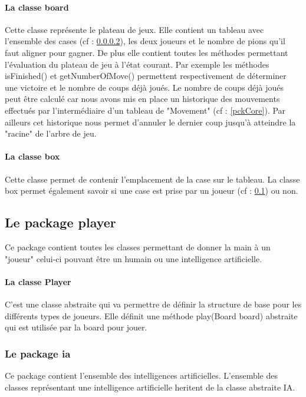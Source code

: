 \documentclass{report}
\begin{document}
                		\paragraph{La classe board}\label{classeBoard}
               			 Cette classe représente le plateau de jeux. Elle contient un tableau avec l'ensemble des cases (cf : \ref{classBox}), les deux joueurs et le nombre de pions qu'il faut aligner pour gagner.
               			 De plus elle contient toutes les méthodes permettant l'évaluation du plateau de jeu à l'état courant. Par exemple les méthodes isFinished() et getNumberOfMove() permettent respectivement de
               			 déterminer une victoire et le nombre de coups déjà joués. Le nombre de coups déjà joués peut être calculé car nous avons mis en place un historique des mouvements effectués
               			 par l'intermédiaire d'un tableau de "Movement" (cf : \ref{pckCore}).
               			 Par ailleurs cet historique nous permet d'annuler le dernier coup jusqu'à atteindre la "racine" de l'arbre de jeu.
                
                    \paragraph{La classe box} \label{classBox}

               Cette classe permet de contenir l'emplacement de la case sur le tableau.
               La classe box permet également savoir si une case est prise par un joueur (cf : \ref{pckPlayer}) ou non.

			\subsection{Le package player} \label{pckPlayer}
			Ce package contient toutes les classes permettant de donner la main à un "joueur" celui-ci pouvant être un humain ou une intelligence artificielle.

			\paragraph{La classe Player}
			C'est une classe abstraite qui va permettre de définir la structure de base pour les différents types de joueurs.
			  Elle définit une méthode play(Board board) abstraite qui est utilisée par la board pour jouer.
            \subsubsection{Le package ia}
              Ce package contient l'ensemble des intelligences artificielles. L'ensemble des classes représentant une intelligence artificielle heritent de la classe abstraite IA.
\end{document}
